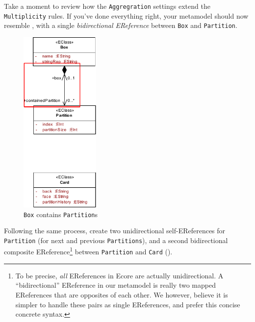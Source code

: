 \begin{stepbystep}
\item Take a moment to review how the \texttt{Aggregration} settings extend the \texttt{Multiplicity} rules. If you've done everything
right, your metamodel should now resemble , with a single \emph{bidirectional EReference} between \texttt{Box} and
\texttt{Partition}.

\vspace{1cm}

\begin{figure}[htbp]
	\centering
  \includegraphics[width=0.35\textwidth]{../../org.moflon.doc.handbook.02_leitnersLearningBox/2_staticSemantics/3_connectingClasses/ccVisImages/ea_relationBoxPartition.pdf}
	\caption{\texttt{Box} contains \texttt{Partition}s}
	\label{ea:ereference_completed}
\end{figure}
\FloatBarrier

\item Following the same process, create two unidirectional self-EReferences for \texttt{Partition} (for next and previous \texttt{Partitions}), and a second bidirectional composite
EReference\footnote{To be precise, \emph{all} EReferences in Ecore are actually unidirectional. A ``bidirectional'' EReference in our metamodel is really two
mapped EReferences that are opposites of each other. We however, believe it is simpler to handle these pairs as single EReferences, and prefer this
concise concrete syntax.} between \texttt{Partition} and \texttt{Card} (). 


\end{stepbystep}
